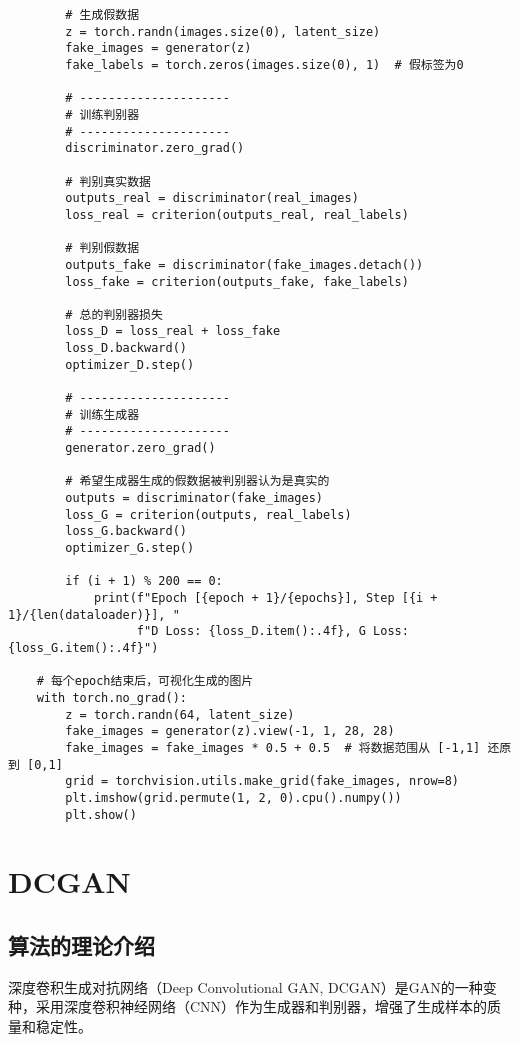 \begin{lstlisting}
        # 生成假数据
        z = torch.randn(images.size(0), latent_size)
        fake_images = generator(z)
        fake_labels = torch.zeros(images.size(0), 1)  # 假标签为0

        # ---------------------
        # 训练判别器
        # ---------------------
        discriminator.zero_grad()

        # 判别真实数据
        outputs_real = discriminator(real_images)
        loss_real = criterion(outputs_real, real_labels)

        # 判别假数据
        outputs_fake = discriminator(fake_images.detach())
        loss_fake = criterion(outputs_fake, fake_labels)

        # 总的判别器损失
        loss_D = loss_real + loss_fake
        loss_D.backward()
        optimizer_D.step()

        # ---------------------
        # 训练生成器
        # ---------------------
        generator.zero_grad()

        # 希望生成器生成的假数据被判别器认为是真实的
        outputs = discriminator(fake_images)
        loss_G = criterion(outputs, real_labels)
        loss_G.backward()
        optimizer_G.step()

        if (i + 1) % 200 == 0:
            print(f"Epoch [{epoch + 1}/{epochs}], Step [{i + 1}/{len(dataloader)}], "
                  f"D Loss: {loss_D.item():.4f}, G Loss: {loss_G.item():.4f}")

    # 每个epoch结束后，可视化生成的图片
    with torch.no_grad():
        z = torch.randn(64, latent_size)
        fake_images = generator(z).view(-1, 1, 28, 28)
        fake_images = fake_images * 0.5 + 0.5  # 将数据范围从 [-1,1] 还原到 [0,1]
        grid = torchvision.utils.make_grid(fake_images, nrow=8)
        plt.imshow(grid.permute(1, 2, 0).cpu().numpy())
        plt.show()

\end{lstlisting}


\section{DCGAN}
\subsection*{算法的理论介绍}
深度卷积生成对抗网络（Deep Convolutional GAN, DCGAN）是GAN的一种变种，采用深度卷积神经网络（CNN）作为生成器和判别器，增强了生成样本的质量和稳定性。

